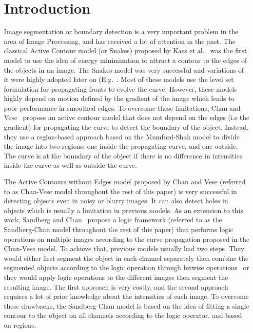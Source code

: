 \documentclass[10pt,twocolumn,letterpaper]{article}
\begin{document}
\section{Introduction}
Image segmentation or boundary detection is a very important problem in the area of Image Processing, and has received a lot of attention in the past. The
classical Active Contour model (or Snakes) proposed by Kass et al.~\cite{kass1988snakes} was the first model to use the idea of energy minimization to attract
a contour to the edges of the objects in an image. The Snakes model was very successful and variations of it were highly adopted later on
(E.g.~\cite{caselles1997geodesic}. Most of these models use the level set formulation for propagating fronts to evolve the curve. However, these models highly
depend on motion defined by the gradient of the image which leads to poor performance in smoothed edges. To overcome these limitations, Chan
and Vese~\cite{chan2001active} propose an active contour model that does not depend on the edges (i.e the gradient) for propagating the curve to detect the
boundary of the object. Instead, they use a region-based approach based on the Mumford-Shah model \cite{mumford1989optimal} to divide the image
into two regions: one inside the propagating curve, and one outside. The curve is at the boundary of the object if there is no difference in intensities inside
the curve as well as outside the curve.

The Active Contours without Edges model proposed by Chan and Vese (referred to as Chan-Vese model throughout the rest of this paper) is very successful in
detecting objects even in noisy or blurry images. It can also detect holes in objects which is usually a limitation in previous models. As an extension to
this work, Sandberg and Chan~\cite{sandberg2005logic} propose a logic framework (referred to as the Sandberg-Chan model throughout the rest of this
paper) that  performs logic operations on multiple images according to the curve propagation proposed in the Chan-Vese model. To achieve that, previous models
usually had two steps. They would either first segment the object in each channel separately then combine the segmented objects according to the logic operation
through bitwise operations~\cite{sapiro1997color, zhu2002region} or they would apply logic operations to the different images then segment the resulting
image. The first approach is
very costly, and the second approach requires a lot of prior knowledge about the intensities of each image. To overcome these drawbacks, the Sandberg-Chan
model is based on the idea of fitting a single contour to the object on all channels according to the logic operator, and based on regions.
\end{document}
